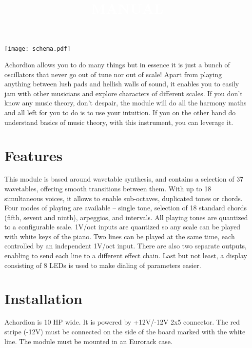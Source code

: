 \documentclass[10pt,nofoldmark,nocombine]{leaflet} %
\begin{document}
\title{\textcolor{white}{MANUAL}}
\author{}
\date{}
\maketitle

\begin{center}
  \texttt{[image: schema.pdf]}
\end{center}

\newpage

\vspace{5mm}

Achordion allows you to do many things but in essence it is just a bunch of oscillators that never go out of tune nor out of scale! Apart from playing anything between lush pads and hellish walls of sound, it enables you to easily jam with other musicians and explore characters of different scales. If you don't know any music theory, don't despair, the module will do all the harmony maths and all left for you to do is to use your intuition. If you on the other hand do understand basics of music theory, with this instrument, you can leverage it.

\section{Features}

This module is based around wavetable synthesis, and contains a selection of 37 wavetables, offering smooth transitions between them. With up to 18 simultaneous voices, it allows to enable sub-octaves, duplicated tones or chords. Four modes of playing are available – single tone, selection of 18 standard chords (fifth, sevent and ninth), arpeggios, and intervals. All playing tones are quantized to a configurable scale. 1V/oct inputs are quantized so any scale can be played with white keys of the piano. Two lines can be played at the same time, each controlled by an independent 1V/oct input. There are also two separate outputs, enabling to send each line to a different effect chain. Last but not least, a display consisting of 8 LEDs is used to make dialing of parameters easier.

\section{Installation}

Achordion is 10 HP wide. It is powered by +12V/-12V 2x5 connector. The red stripe (-12V) must be connected on the side of the board marked with the white line. The module must be mounted in an Eurorack case.
\end{document}

